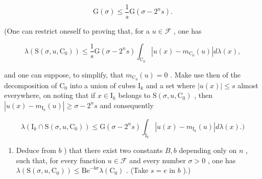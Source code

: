 \[
\mathrm{G} (\sigma) \leqslant \frac {1}{s} \mathrm{G} (\sigma - 2 ^ {n} s).
\]

(One can restrict oneself to proving that, for a \(u \in \mathcal{F}\) , one has

\[
\lambda \left(\mathrm{S} (\sigma , u, \mathrm{C} _ {0})\right) \leqslant \frac {1}{s} \mathrm{G} (\sigma - 2 ^ {n} s) \int_ {\mathrm{C} _ {0}} | u (x) - m _ {\mathrm{C} _ {0}} (u) | d \lambda (x),
\]

and one can suppose, to simplify, that \(m_{\mathrm{C}_0}(u) = 0\) . Make use then of the decomposition of \(\mathrm{C}_0\) into a union of cubes \(\mathrm{I}_k\) and a set where \(|u(x)| \leqslant s\) almost everywhere, on noting that if \(x \in \mathrm{I}_k\) belongs to \(\mathrm{S}(\sigma, u, \mathrm{C}_0)\) , then \(|u(x) - m_{\mathrm{I}_k}(u)| \geqslant \sigma - 2^n s\) and consequently

\[
\lambda \left(\mathrm{I} _ {k} \cap \mathrm{S} (\sigma , u, \mathrm{C} _ {0})\right) \leqslant \mathrm{G} (\sigma - 2 ^ {n} s) \int_ {\mathrm{I} _ {k}} | u (x) - m _ {\mathrm{I} _ {k}} (u) | d \lambda (x). \Big)
\]

\begin{enumerate}
\def\labelenumi{\alph{enumi})}
\setcounter{enumi}{2}
\tightlist
\item
  Deduce from \(b\) ) that there exist two constants \(B, b\) depending only on \(n\) , such that, for every function \(u \in \mathcal{F}\) and every number \(\sigma > 0\) , one has \(\lambda(\mathrm{S}(\sigma, u, \mathrm{C}_0)) \leqslant \mathrm{Be}^{-b\sigma}\lambda(\mathrm{C}_0)\) . (Take \(s = e\) in \(b\) ).)
\end{enumerate}

